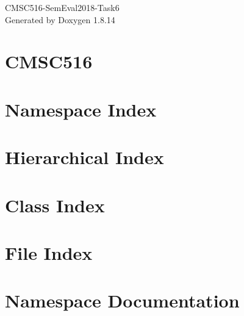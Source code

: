 \documentclass[twoside]{book}
\newcommand{\+}{\discretionary{\mbox{\scriptsize$\hookleftarrow$}}{}{}}
\newcommand{\clearemptydoublepage}{%
  \newpage{\pagestyle{empty}\cleardoublepage}%
}
\begin{document}
\hypersetup{pageanchor=false,
             bookmarksnumbered=true,
             pdfencoding=unicode
            }
\begin{titlepage}
\vspace*{7cm}
\begin{center}%
{\Large C\+M\+S\+C516-\/\+Sem\+Eval2018-\/\+Task6 }\\
\vspace*{1cm}
{\large Generated by Doxygen 1.8.14}\\
\end{center}
\end{titlepage}
\clearemptydoublepage
{}
\tableofcontents
\clearemptydoublepage
{}
\hypersetup{pageanchor=true}

\chapter{C\+M\+S\+C516}
\label{md_README}

\chapter{Namespace Index}

\chapter{Hierarchical Index}

\chapter{Class Index}

\chapter{File Index}

\chapter{Namespace Documentation}








\end{document}
